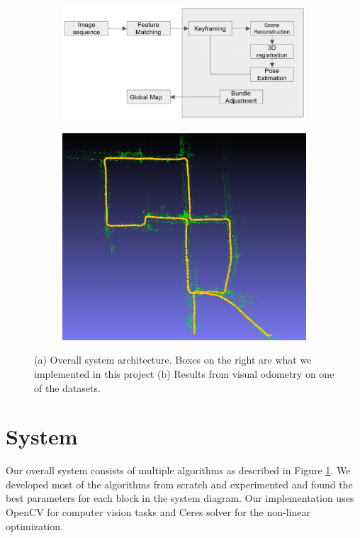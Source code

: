 \documentclass{article}
\begin{document}
\begin{figure}
    \centering
    \begin{subfigure}[b]{.55\linewidth}
        \includegraphics[width=\linewidth]{./system.png}
        \caption{}
        \label{fig:system}
    \end{subfigure}
    \begin{subfigure}[b]{.29\linewidth}
        \includegraphics[width=\linewidth]{./vo_stereo_5.png}
        \caption{}
        \label{fig:firstresult}
    \end{subfigure}
    \caption{(a) Overall system architecture. Boxes on the right are what we implemented in this project (b) Results from visual odometry on one of the datasets.}
\end{figure}

\section{System}
Our overall system consists of multiple algorithms as described in Figure \ref{fig:system}. We developed most of the algorithms from scratch and experimented and found the best parameters for each block in the system diagram. Our implementation uses OpenCV\cite{opencv} for computer vision tasks and Ceres solver\cite{ceres-solver} for the non-linear optimization.
\end{document}

